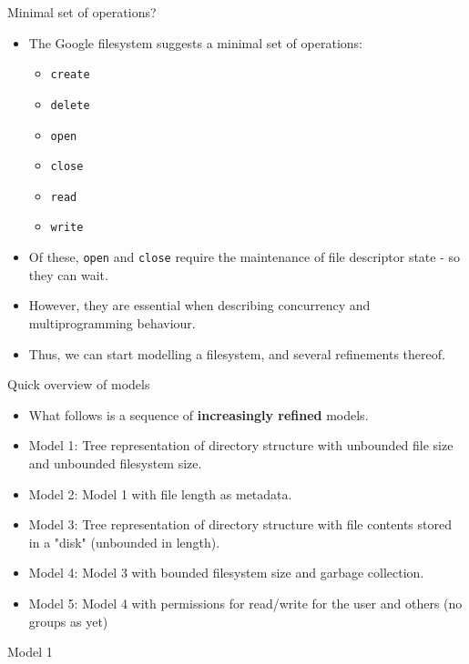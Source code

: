 \documentclass{beamer}
\begin{document}
\begin{frame}{Minimal set of operations?}
  \begin{itemize}
  \item The Google filesystem suggests a minimal set of operations:
    \begin{itemize}
    \item \texttt{create}
    \item \texttt{delete}
    \item \texttt{open}
    \item \texttt{close}
    \item \texttt{read}
    \item \texttt{write}
    \end{itemize}
  \item Of these, \texttt{open} and \texttt{close} require the
    maintenance of file descriptor state - so they can wait.
  \item However, they are essential when describing concurrency and
    multiprogramming behaviour.
  \item Thus, we can start modelling a filesystem, and several
    refinements thereof.
  \end{itemize}
\end{frame}

\begin{frame}{Quick overview of models}
  \begin{itemize}
  \item What follows is a sequence of {\bf increasingly refined} models.
  \item Model 1: Tree representation of directory structure with unbounded
    file size and unbounded filesystem size.
  \item Model 2: Model 1 with file length as metadata.
  \item Model 3: Tree representation of directory structure with
    file contents stored in a "disk" (unbounded in length).
  \item Model 4: Model 3 with bounded filesystem size and garbage
    collection.
  \item Model 5: Model 4 with permissions for read/write for the user
    and others (no groups as yet)
  \end{itemize}
\end{frame}

\begin{frame}{Model 1}
\end{frame}
\end{document}
